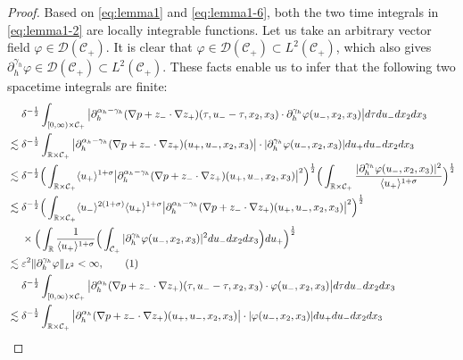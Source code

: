\documentclass[10pt,reqno]{amsart}
\numberwithin{equation}{section}
\begin{document}
\begin{proof}
Based on \eqref{eq:lemma1} and \eqref{eq:lemma1-6},  
both the two time integrals in \eqref{eq:lemma1-2} are locally integrable functions. 
Let us take an arbitrary vector field $\varphi\in \mathcal{D}(\mathcal{C}_+)$. It is clear that $\varphi\in \mathcal{D}(\mathcal{C}_+)\subset L^2(\mathcal{C}_+)$, which also gives  $\partial_{h}^{\gamma_h}\varphi\in \mathcal{D}(\mathcal{C}_+)\subset L^2(\mathcal{C}_+)$. 
These facts enable us to infer that the following two spacetime integrals are finite:
\begin{align*}
	&\ \ \ \
	\delta^{-\frac{1}{2}}\int_{[0,\infty)\times \mathcal{C}_+}\big| \partial_h^{\alpha_h-\gamma_h}(\nabla p+z_{-}\cdot\nabla z_{+}) 
	(\tau,u_--\tau,x_2,x_3)\cdot\partial_{h}^{\gamma_h}\varphi(u_-,x_2,x_3)\big|d\tau du_-dx_2dx_3\\
	&\lesssim \delta^{-\frac{1}{2}}\int_{\mathbb{R}\times\mathcal{C}_+}\big|\partial_h^{\alpha_h-\gamma_h}(\nabla p+z_{-}\cdot\nabla z_{+}) 
	(u_+,u_-,x_2,x_3)\big|\cdot|\partial_{h}^{\gamma_h}\varphi(u_-,x_2,x_3)|du_+du_-dx_2dx_3\\
	&\lesssim
	\delta^{-\frac{1}{2}}\Big(\int_{\mathbb{R}\times \mathcal{C}_+}\langle  u_+\rangle^{1+\sigma}\big|\partial_h^{\alpha_h-\gamma_h}(\nabla p+z_{-}\cdot\nabla z_{+}) 
	(u_+,u_-,x_2,x_3)\big|^2 \Big)^{\frac{1}{2}}
	\Big(\int_{\mathbb{R}\times \mathcal{C}_+}\frac{|\partial_{h}^{\gamma_h}\varphi(u_-,x_2,x_3)|^2}{\langle u_+\rangle^{1+\sigma}}\Big)^{\frac{1}{2}}\\
	&\lesssim\delta^{-\frac{1}{2}}\Big(\int_{\mathbb{R}\times \mathcal{C}_+}\langle u_-\rangle^{2(1+\sigma)}\langle u_+\rangle^{1+\sigma}\big|\partial_h^{\alpha_h-\gamma_h}(\nabla p+z_{-}\cdot\nabla z_{+}) (u_+,u_-,x_2,x_3)\big|^2\Big)^{\frac{1}{2}}\\
	&\ \ \ \ \times \Big(\int_{\mathbb{R}}\frac{1}{\langle u_+\rangle^{1+\sigma}}\Big(\int_{\mathcal{C}_+} |\partial_{h}^{\gamma_h} \varphi(u_-,x_2,x_3)|^2  du_-dx_2dx_3 \Big)du_+\Big)^{\frac{1}{2}}\\
	&\lesssim\varepsilon^2\|\partial_{h}^{\gamma_h}\varphi\|_{L^2}<\infty,\stepcounter{equation}\tag{\theequation}\label{eq:lemma1-3}\\
	&\ \ \ \
	\delta^{-\frac{1}{2}}\int_{[0,\infty)\times \mathcal{C}_+}\big| \partial_h^{\alpha_h}(\nabla p+z_{-}\cdot\nabla z_{+}) 
	(\tau,u_--\tau,x_2,x_3)\cdot\varphi(u_-,x_2,x_3)\big|d\tau du_-dx_2dx_3\\
	&\lesssim \delta^{-\frac{1}{2}}\int_{\mathbb{R}\times\mathcal{C}_+}\big|\partial_h^{\alpha_h}(\nabla p+z_{-}\cdot\nabla z_{+}) 
	(u_+,u_-,x_2,x_3)\big|\cdot|\varphi(u_-,x_2,x_3)|du_+du_-dx_2dx_3\\

\end{align*}
\end{proof}
\end{document}
